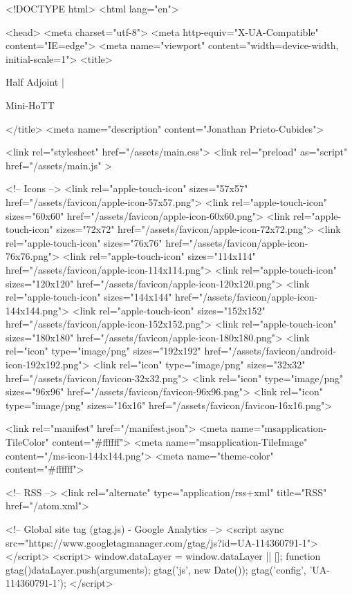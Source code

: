 <!DOCTYPE html>
<html lang="en">

<head>
  <meta charset="utf-8">
  <meta http-equiv="X-UA-Compatible" content="IE=edge">
  <meta name="viewport" content="width=device-width, initial-scale=1">
  <title>
    
      
        Half Adjoint |
      
        Mini-HoTT
    
  </title>
  <meta name="description" content="Jonathan Prieto-Cubides">

  <link rel="stylesheet" href="/assets/main.css">
  <link rel="preload" as="script" href="/assets/main.js" >

  <!-- Icons -->
  <link rel="apple-touch-icon" sizes="57x57" href="/assets/favicon/apple-icon-57x57.png">
  <link rel="apple-touch-icon" sizes="60x60" href="/assets/favicon/apple-icon-60x60.png">
  <link rel="apple-touch-icon" sizes="72x72" href="/assets/favicon/apple-icon-72x72.png">
  <link rel="apple-touch-icon" sizes="76x76" href="/assets/favicon/apple-icon-76x76.png">
  <link rel="apple-touch-icon" sizes="114x114" href="/assets/favicon/apple-icon-114x114.png">
  <link rel="apple-touch-icon" sizes="120x120" href="/assets/favicon/apple-icon-120x120.png">
  <link rel="apple-touch-icon" sizes="144x144" href="/assets/favicon/apple-icon-144x144.png">
  <link rel="apple-touch-icon" sizes="152x152" href="/assets/favicon/apple-icon-152x152.png">
  <link rel="apple-touch-icon" sizes="180x180" href="/assets/favicon/apple-icon-180x180.png">
  <link rel="icon" type="image/png" sizes="192x192"  href="/assets/favicon/android-icon-192x192.png">
  <link rel="icon" type="image/png" sizes="32x32" href="/assets/favicon/favicon-32x32.png">
  <link rel="icon" type="image/png" sizes="96x96" href="/assets/favicon/favicon-96x96.png">
  <link rel="icon" type="image/png" sizes="16x16" href="/assets/favicon/favicon-16x16.png">

  <link rel="manifest" href="/manifest.json">
  <meta name="msapplication-TileColor" content="#ffffff">
  <meta name="msapplication-TileImage" content="/ms-icon-144x144.png">
  <meta name="theme-color" content="#ffffff">

  <!-- RSS -->
  <link rel="alternate" type="application/rss+xml" title="RSS" href="/atom.xml">

  <!-- Global site tag (gtag.js) - Google Analytics -->
  <script async src="https://www.googletagmanager.com/gtag/js?id=UA-114360791-1"></script>
  <script>
    window.dataLayer = window.dataLayer || [];
    function gtag(){dataLayer.push(arguments);}
    gtag('js', new Date());
    gtag('config', 'UA-114360791-1');
  </script>

